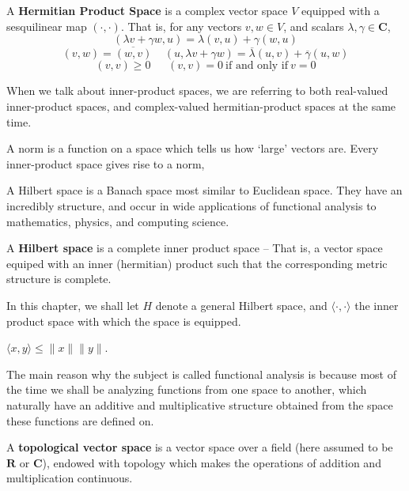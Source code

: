 \begin{definition}
    A {\bf Hermitian Product Space} is a complex vector space $V$ equipped with a sesquilinear map $(\cdot, \cdot)$. That is, for any vectors $v,w \in V$, and scalars $\lambda, \gamma \in \mathbf{C}$,
    \[ (\lambda v + \gamma w, u) = \lambda (v, u) + \gamma (w, u) \]
    \[ (v, w) = \overline{(w, v)}\ \ \ \ \ (u, \lambda v + \gamma w) = \overline{\lambda} (u,v) + \overline{\gamma} (u,w) \]
    \[ (v, v) \geq 0\ \ \ \ \ \ \ (v, v) = 0\ \text{if and only if}\ v = 0 \]
\end{definition}

When we talk about inner-product spaces, we are referring to both real-valued inner-product spaces, and complex-valued hermitian-product spaces at the same time.

A norm is a function on a space which tells us how `large' vectors are.
Every inner-product space gives rise to a norm,
%
\[ \]


A Hilbert space is a Banach space most similar to Euclidean space. They have an incredibly structure, and occur in wide applications of functional analysis to mathematics, physics, and computing science.

\begin{definition}
    A {\bf Hilbert space} is a complete inner product space -- That is, a vector space equiped with an inner (hermitian) product such that the corresponding metric structure is complete.
\end{definition}

In this chapter, we shall let $H$ denote a general Hilbert space, and $\langle \cdot, \cdot \rangle$ the inner product space with which the space is equipped.

\begin{theorem}
    $\langle x, y \rangle \leq \| x \| \| y \|$.
\end{theorem}

The main reason why the subject is called functional analysis is because most of the time we shall be analyzing functions from one space to another, which naturally have an additive and multiplicative structure obtained from the space these functions are defined on.

\begin{definition}
    A {\bf topological vector space} is a vector space over a field (here assumed to be $\mathbf{R}$ or $\mathbf{C}$), endowed with  topology which makes the operations of addition and multiplication continuous.
\end{definition}

